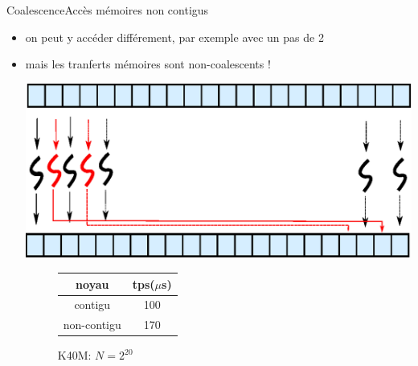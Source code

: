 \documentclass[11pt,mathserif]{beamer}
\newcommand{\kontuz}{\faExclamationTriangle}
\newcommand{\adibi}{\faCommentO}
\begin{document}
\begin{frame}{Coalescence}{Accès mémoires non contigus}
  \begin{itemize}[<+->]
    \item[\adibi] on peut y accéder différement, par exemple avec un pas de 2
\begin{center}
  
\end{center}
    \item[\kontuz] mais les tranferts mémoires sont non-coalescents !
\begin{minipage}[c]{0.49\linewidth}
  \includegraphics[width=0.9\linewidth]{fig/coalScaleHalf.eps}
\end{minipage}
\begin{minipage}[r]{0.49\linewidth}
  \vspace{1cm}
  \begin{figure}[h]
    \begin{tabular}{|c|c|}
      \hline
      noyau & tps($\mu$s)  \\
      \hline
      contigu & 100 \\
      non-contigu  & 170 \\
      \hline
    \end{tabular}
    \caption{K40M: $N = 2^{20}$}
  \end{figure}
\end{minipage}
  \end{itemize}
\end{frame}
\end{document}
